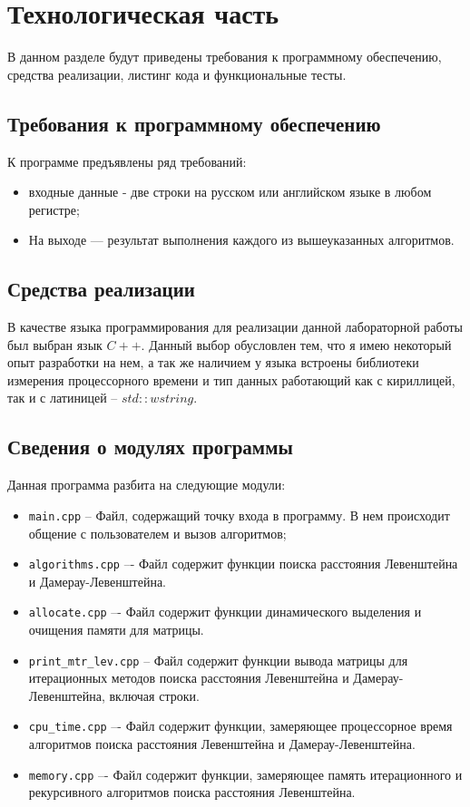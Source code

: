 \chapter{Технологическая часть}

В данном разделе будут приведены требования к программному обеспечению, средства реализации, листинг кода и функциональные тесты.

\section{Требования к программному обеспечению}

К программе предъявлены ряд требований:

\begin{itemize}
	\item входные данные - две строки на русском или английском языке в любом
	регистре;
	\item На выходе — результат выполнения каждого из вышеуказанных алгоритмов.
\end{itemize}

\section{Средства реализации}

В качестве языка программирования для реализации данной лабораторной работы был выбран язык $C++$. Данный выбор обусловлен тем,
что я имею некоторый опыт разработки на нем, а так же наличием у языка
встроены библиотеки измерения процессорного времени и тип данных работающий как с кириллицей, так и с латиницей -- $std::wstring$.


\section{Сведения о модулях программы}

Данная программа разбита на следующие модули:

\begin{itemize}
	\item \texttt{main.cpp} -- Файл, содержащий точку входа в программу. В нем происходит
	общение с пользователем и вызов алгоритмов;
	\item \texttt{algorithms.cpp} –- Файл содержит функции поиска расстояния Левенштейна и Дамерау-Левенштейна.
	\item \texttt{allocate.cpp} –- Файл содержит функции динамического выделения и очищения памяти для матрицы.
	\item \texttt{print\_mtr\_lev.cpp} -- Файл содержит функции вывода матрицы для итерационных методов поиска расстояния Левенштейна и Дамерау-Левенштейна, включая строки.
	\item \texttt{cpu\_time.cpp} –- Файл содержит функции, замеряющее процессорное время алгоритмов поиска расстояния Левенштейна и Дамерау-Левенштейна.
	\item \texttt{memory.cpp} –- Файл содержит функции, замеряющее память итерационного и рекурсивного алгоритмов поиска расстояния Левенштейна.
\end{itemize}

